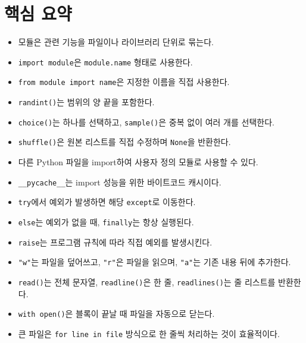 \documentclass[11pt,a4paper]{article}
\begin{document}
\section{핵심 요약}

\begin{itemize}[leftmargin=1.5em]
    \item 모듈은 관련 기능을 파일이나 라이브러리 단위로 묶는다.
    \item \texttt{import module}은 \texttt{module.name} 형태로 사용한다.
    \item \texttt{from module import name}은 지정한 이름을 직접 사용한다.
    \item \texttt{randint()}는 범위의 양 끝을 포함한다.
    \item \texttt{choice()}는 하나를 선택하고, \texttt{sample()}은 중복 없이 여러 개를 선택한다.
    \item \texttt{shuffle()}은 원본 리스트를 직접 수정하며 \texttt{None}을 반환한다.
    \item 다른 Python 파일을 import하여 사용자 정의 모듈로 사용할 수 있다.
    \item \texttt{\_\_pycache\_\_}는 import 성능을 위한 바이트코드 캐시이다.
    \item \texttt{try}에서 예외가 발생하면 해당 \texttt{except}로 이동한다.
    \item \texttt{else}는 예외가 없을 때, \texttt{finally}는 항상 실행된다.
    \item \texttt{raise}는 프로그램 규칙에 따라 직접 예외를 발생시킨다.
    \item \texttt{"w"}는 파일을 덮어쓰고, \texttt{"r"}은 파일을 읽으며, \texttt{"a"}는 기존 내용 뒤에 추가한다.
    \item \texttt{read()}는 전체 문자열, \texttt{readline()}은 한 줄, \texttt{readlines()}는 줄 리스트를 반환한다.
    \item \texttt{with open()}은 블록이 끝날 때 파일을 자동으로 닫는다.
    \item 큰 파일은 \texttt{for line in file} 방식으로 한 줄씩 처리하는 것이 효율적이다.
\end{itemize}
\end{document}
